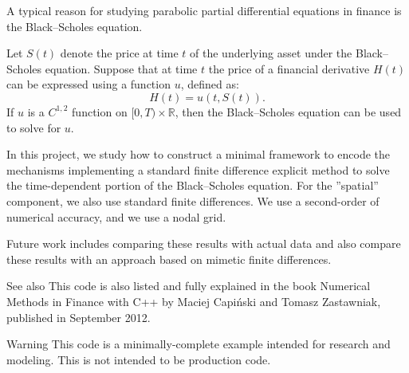 A typical reason for studying parabolic partial differential equations in finance is the Black--Scholes equation.

Let $ S(t) $ denote the price at time $ t $ of the underlying asset under the Black--Scholes equation. Suppose that at time $ t $ the price of a financial derivative $ H(t) $ can be expressed using a function $ u $, defined as\+: \[ H(t) = u(t, S (t)). \] If $ u $ is a $ C^{1,2} $ function on $ [0,T)\times \mathbb{R} $, then the Black--Scholes equation can be used to solve for $ u $.

In this project, we study how to construct a minimal framework to encode the mechanisms implementing a standard finite difference explicit method to solve the time-\/dependent portion of the Black--Scholes equation. For the ''spatial'' component, we also use standard finite differences. We use a second-\/order of numerical accuracy, and we use a nodal grid.

Future work includes comparing these results with actual data and also compare these results with an approach based on mimetic finite differences.

\begin{DoxySeeAlso}{See also}
This code is also listed and fully explained in the book Numerical Methods in Finance with C++ by Maciej Capiński and Tomasz Zastawniak, published in September 2012.
\end{DoxySeeAlso}
\begin{DoxyWarning}{Warning}
This code is a minimally-\/complete example intended for research and modeling. This is not intended to be production code. 
\end{DoxyWarning}
